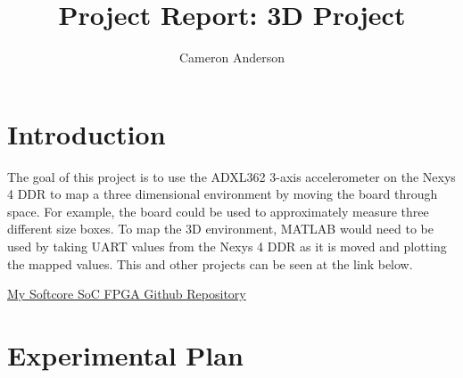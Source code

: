 \documentclass{article}
\author{Cameron Anderson}
\title{Project Report: 3D Project}
\begin{document}
\maketitle



\section{Introduction}
The goal of this project is to use the ADXL362 3-axis accelerometer on the Nexys 4 DDR to map a three dimensional environment by moving the board through space. For example, the board could be used to approximately measure three different size boxes. To map the 3D environment, MATLAB would need to be used by taking UART values from the Nexys 4 DDR as it is moved and plotting the mapped values. This and other projects can be seen at the link below.

\begin{center}
\href{https://github.com/camerona254/SoftcoreSoCFPGA.git}{My Softcore SoC FPGA Github Repository}
\end{center}

\section{Experimental Plan}
\end{document}

